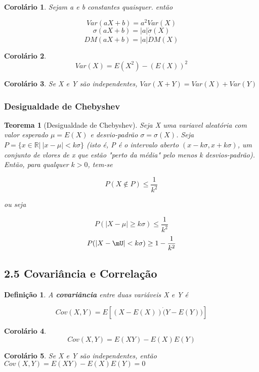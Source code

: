 \documentclass[12pt]{article}
\newtheorem{theorem}{Teorema}[section]
\newtheorem{corollary}{Corolário}[theorem]
\newtheorem{definition}{Definição}
\begin{document}
\begin{corollary}
    Sejam a e b constantes quaisquer. então
    
    $$Var(a X + b) = a^2 Var(X)$$
    $$\sigma (a X + b) = |a| \dot \sigma(X)$$
    $$D M(a X + b) = |a| \dot D M(X)$$
\end{corollary}

\begin{corollary}
    $$Var(X) = E(X^2) - (E(X))^2$$
\end{corollary}

\begin{corollary}
    Se X e Y são independentes, $Var(X + Y) = Var(X) + Var(Y)$
\end{corollary}

\subsubsection*{Desigualdade de Chebyshev}
\begin{theorem}[Desigualdade de Chebyshev]
    Seja X uma variavel aleatória com valor esperado $\mu = E(X)$ e desvio-padrão $\sigma = \sigma(X)$. Seja $P = \{ x \in \mathbb{R} | \ |x-\mu| < k \sigma \}$ (isto é, P é o intervalo aberto $(x - k \sigma, x + k \sigma)$, um conjunto de vlores de x que estão "perto da média" pelo menos k desvios-padrão). Então, para qualquer $k > 0$, tem-se
    
    $$P(X \notin P) \leq \dfrac{1}{k^2}$$
    
    ou seja
    
    $$P(|X - \mu| \geq k \sigma) \leq \dfrac{1}{k^2}$$
    $$P(|X - \mU| < k \sigma) \geq 1 - \dfrac{1}{k^2}$$
\end{theorem}

\subsection*{2.5 Covariância e Correlação}
\begin{definition}
    A \textbf{covariância} entre duas variáveis X e Y é 
    
    $$Cov (X, Y) = E[(X - E(X)) \dot (Y - E(Y))]$$
\end{definition}

\begin{corollary}
    $$Cov(X, Y) = E(XY) - E(X) E(Y)$$
\end{corollary}

\begin{corollary}
    Se X e Y são independentes, então $Cov(X, Y) = E(XY) - E(X) E(Y) = 0$
\end{corollary}
\end{document}
